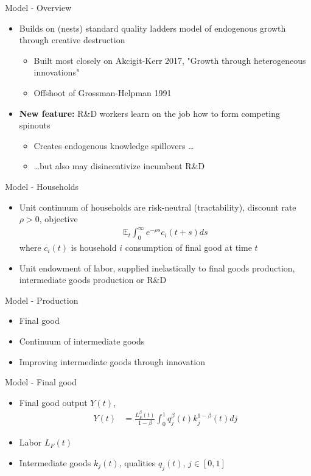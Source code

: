 \documentclass[english,usenames,dvipsnames]{beamer}
\begin{document}
\begin{frame}{Model - Overview}
\begin{itemize}	
	\item Builds on (nests) standard \alert{quality ladders model} of \alert{endogenous growth} through \alert{creative destruction} 
	\begin{itemize}
		\item Built most closely on Akcigit-Kerr 2017, "Growth through heterogeneous innovations"
		\item Offshoot of Grossman-Helpman 1991
	\end{itemize}
	\item \textbf{New feature:} R\&D workers \alert{learn on the job} how to form \alert{competing spinouts}
	\begin{itemize}
		\item Creates \alert{endogenous knowledge spillovers} \ldots
		\item \ldots but also may \alert{disincentivize incumbent R\&D}
	\end{itemize} 
\end{itemize}
\end{frame}

\begin{frame}{Model - Households}
\begin{itemize}
	\item Unit continuum of households are risk-neutral (tractability), discount rate $\rho > 0$, objective
	\begin{align*}
		\mathbb{E}_t \int_0^{\infty} e^{-\rho s} c_i(t+s) ds
	\end{align*}
	where $c_i(t)$ is household $i$ consumption of final good at time $t$
	\item Unit endowment of labor, supplied inelastically to final goods production, intermediate goods production or R\&D
\end{itemize}
\end{frame}

\begin{frame}{Model - Production}
\begin{itemize}
	\item Final good
	\item Continuum of intermediate goods
	\item Improving intermediate goods through innovation
\end{itemize}
\end{frame}


\begin{frame}{Model - Final good}
\begin{itemize}
	\item Final good output $Y(t)$,
	\begin{align*}
		Y(t) &= \frac{L_F^{\beta}(t)}{1-\beta} \int_0^1 q_j^{\beta}(t) k_j^{1-\beta} (t) dj 
	\end{align*}
	\item Labor $L_F(t)$
	\item Intermediate goods $k_j(t)$, qualities $q_j(t)$, $j \in [0,1]$
\end{itemize}
\end{frame}
\end{document}
